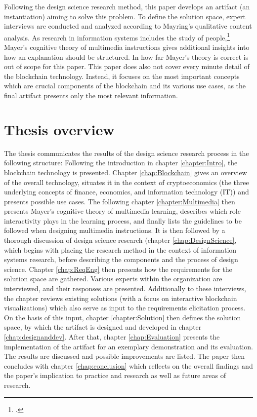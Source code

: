Following the design science research method, this paper develops an artifact (an instantiation) aiming to solve this problem. To define the solution space, expert interviews are conducted and analyzed according to Mayring's qualitative content analysis. As research in information systems includes the study of people,\footcite[Cf.][p.11]{OsterleGestaltungsorientierteWirtschaftsinformatikPladoyer2010} Mayer's cognitive theory of multimedia instructions gives additional insights into how an explanation should be structured. In how far Mayer's theory is correct is out of scope for this paper. This paper does also not cover every minute detail of the blockchain technology. Instead, it focuses on the most important concepts which are crucial components of the blockchain and its various use cases, as the final artifact presents only the most relevant information. 
    
\section{Thesis overview} \label{sec:ThesisOverview}
The thesis communicates the results of the design science research process in the following structure: Following the introduction in chapter \ref{chapter:Intro}, the blockchain technology is presented. Chapter \ref{chap:Blockchain} gives an overview of the overall technology, situates it in the context of cryptoeconomics (the three underlying concepts of finance, economics, and information technology (IT)) and presents possible use cases. The following chapter \ref{chapter:Multimedia} then presents Mayer's cognitive theory of multimedia learning, describes which role interactivity plays in the learning process, and finally lists the guidelines to be followed when designing multimedia instructions. It is then followed by a thorough discussion of design science research (chapter \ref{chap:DesignScience}, which begins with placing the research method in the context of information systems research, before describing the components and the process of design science. Chapter \ref{chap:ReqEng} then presents how the requirements for the solution space are gathered. Various experts within the organization are interviewed, and their responses are presented. Additionally to these interviews, the chapter reviews existing solutions (with a focus on interactive blockchain visualizations) which also serve as input to the requirements elicitation process. On the basis of this input, chapter \ref{chapter:Solution} then defines the solution space, by which the artifact is designed and developed in chapter \ref{chap:designanddev}. After that, chapter \ref{chap:Evaluation} presents the implementation of the artifact for an exemplary demonstration and its evaluation. The results are discussed and possible improvements are listed. The paper then concludes with chapter \ref{chap:conclusion} which reflects on the overall findings and the paper's implication to practice and research as well as future areas of research.

